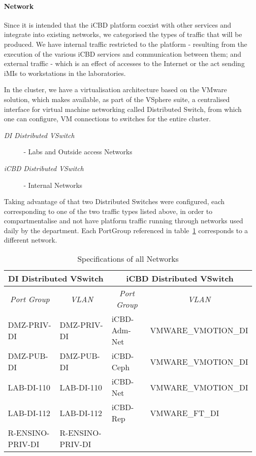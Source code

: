 \paragraph{Network}
\label{par:impl_infra_network}

Since it is intended that the iCBD platform coexist with other services and integrate into existing networks, we categorised the types of traffic that will be produced. We have internal traffic restricted to the platform - resulting from the execution of the various iCBD services and communication between them; and external traffic - which is an effect of accesses to the Internet or the act sending iMIs to workstations in the laboratories.

In the cluster, we have a virtualisation architecture based on the VMware solution, which makes available, as part of the VSphere suite, a centralised interface for virtual machine networking called Distributed Switch, from which one can configure, VM connections to switches for the entire cluster. 

\begin{description}
	\item [\textit{DI Distributed VSwitch}] - Labs and Outside access Networks
	\item [\textit{iCBD Distributed VSwitch}] - Internal Networks
\end{description}

Taking advantage of that two Distributed Switches were configured, each corresponding to one of the two traffic types listed above, in order to compartmentalise and not have platform traffic running through networks used daily by the department. Each PortGroup referenced in table~\ref{tab:impl_dvs} corresponds to a different network.

\begin{table}[]
\centering
\begin{tabular}{ll|ll}
\multicolumn{2}{c|}{\textbf{DI Distributed VSwitch}} & \multicolumn{2}{c}{\textbf{iCBD Distributed VSwitch}} \\ \hline
\multicolumn{1}{c}{\textit{Port Group}} & \multicolumn{1}{c|}{\textit{VLAN}} & \multicolumn{1}{c}{\textit{Port Group}} & \multicolumn{1}{c}{\textit{VLAN}} \\
DMZ-PRIV-DI & DMZ-PRIV-DI & iCBD-Adm-Net & VMWARE\_VMOTION\_DI \\
DMZ-PUB-DI & DMZ-PUB-DI & iCBD-Ceph & VMWARE\_VMOTION\_DI \\
LAB-DI-110 & LAB-DI-110 & iCBD-Net & VMWARE\_VMOTION\_DI \\
LAB-DI-112 & LAB-DI-112 & iCBD-Rep & VMWARE\_FT\_DI \\
R-ENSINO-PRIV-DI & R-ENSINO-PRIV-DI &  & 
\end{tabular}
\caption{Specifications of all Networks}
\label{tab:impl_dvs}
\end{table}

